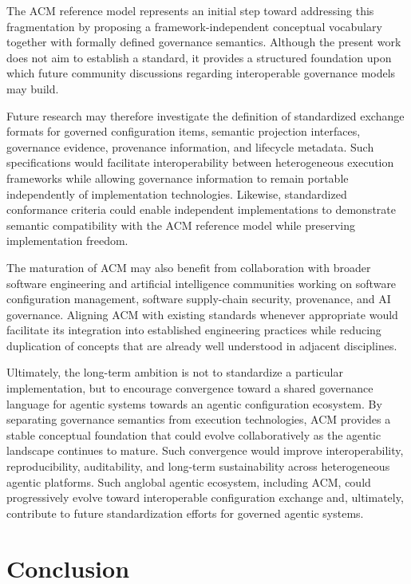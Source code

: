 \documentclass[10pt]{article}
\begin{document}
The ACM reference model represents an initial step toward addressing this fragmentation by proposing a framework-independent conceptual vocabulary together with formally defined governance semantics. Although the present work does not aim to establish a standard, it provides a structured foundation upon which future community discussions regarding interoperable governance models may build.

Future research may therefore investigate the definition of standardized exchange formats for governed configuration items, semantic projection interfaces, governance evidence, provenance information, and lifecycle metadata. Such specifications would facilitate interoperability between heterogeneous execution frameworks while allowing governance information to remain portable independently of implementation technologies. Likewise, standardized conformance criteria could enable independent implementations to demonstrate semantic compatibility with the ACM reference model while preserving implementation freedom.

The maturation of ACM may also benefit from collaboration with broader software engineering and artificial intelligence communities working on software configuration management, software supply-chain security, provenance, and AI governance. Aligning ACM with existing standards whenever appropriate would facilitate its integration into established engineering practices while reducing duplication of concepts that are already well understood in adjacent disciplines.

Ultimately, the long-term ambition is not to standardize a particular implementation, but to encourage convergence toward a shared governance language for agentic systems towards an agentic configuration ecosystem. By separating governance semantics from execution technologies, ACM provides a stable conceptual foundation that could evolve collaboratively as the agentic landscape continues to mature. Such convergence would improve interoperability, reproducibility, auditability, and long-term sustainability across heterogeneous agentic platforms. Such anglobal agentic ecosystem, including ACM, could progressively evolve toward interoperable configuration exchange and, ultimately, contribute to future standardization efforts for governed agentic systems.

\section{Conclusion}
\label{sec:conclusion}
\end{document}
